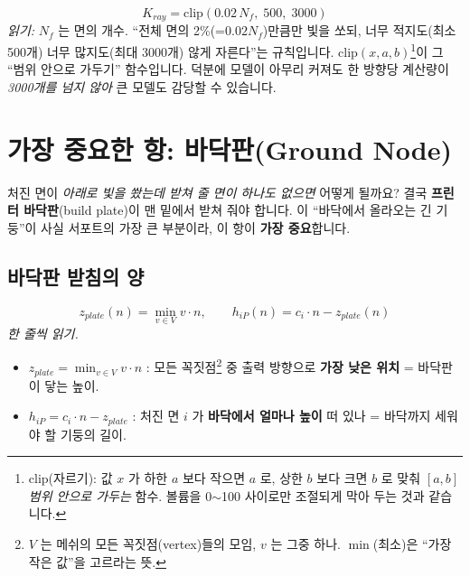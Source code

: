 \documentclass[11pt,a4paper]{article}
\begin{document}
\begin{equation}
K_{ray}=\mathrm{clip}\!\left(0.02\,N_f,\;500,\;3000\right)
\label{eq:kray}
\end{equation}
\noindent\textit{읽기:} $N_f$ 는 면의 개수. ``전체 면의 2\%(=$0.02 N_f$)만큼만 빛을
쏘되, 너무 적지도(최소 500개) 너무 많지도(최대 3000개) 않게 자른다''는 규칙입니다.
$\mathrm{clip}(x,a,b)$\footnote{clip(자르기): 값 $x$ 가 하한 $a$ 보다 작으면 $a$ 로,
상한 $b$ 보다 크면 $b$ 로 맞춰 \emph{$[a,b]$ 범위 안으로 가두는} 함수. 볼륨을
0$\sim$100 사이로만 조절되게 막아 두는 것과 같습니다.}이 그 ``범위 안으로 가두기''
함수입니다. 덕분에 모델이 아무리 커져도 한 방향당 계산량이 \emph{3000개를 넘지 않아}
큰 모델도 감당할 수 있습니다.

\section{가장 중요한 항: 바닥판(Ground Node)}

처진 면이 \emph{아래로 빛을 쐈는데 받쳐 줄 면이 하나도 없으면} 어떻게 될까요?
결국 \textbf{프린터 바닥판}(build plate)이 맨 밑에서 받쳐 줘야 합니다. 이 ``바닥에서
올라오는 긴 기둥''이 사실 서포트의 가장 큰 부분이라, 이 항이 \textbf{가장 중요}합니다.

\subsection{바닥판 받침의 양}

\begin{equation}
z_{plate}(n)=\min_{v\in V} v\cdot n,
\qquad
h_{iP}(n)=c_i\cdot n - z_{plate}(n)
\label{eq:plate-height}
\end{equation}
\noindent\textit{한 줄씩 읽기.}
\begin{itemize}[leftmargin=1.6em]
\item $z_{plate}=\min_{v\in V} v\cdot n$ : 모든 꼭짓점\footnote{$V$ 는 메쉬의 모든
꼭짓점(vertex)들의 모임, $v$ 는 그중 하나. $\min$(최소)은 ``가장 작은 값''을 고르라는
뜻.} 중 출력 방향으로 \textbf{가장 낮은 위치} = 바닥판이 닿는 높이.
\item $h_{iP}=c_i\cdot n - z_{plate}$ : 처진 면 $i$ 가 \textbf{바닥에서 얼마나 높이}
떠 있나 = 바닥까지 세워야 할 기둥의 길이.
\end{itemize}
\end{document}
